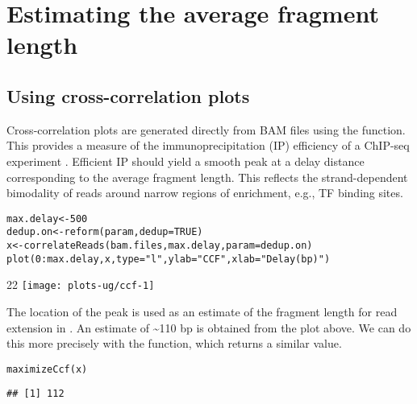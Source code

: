\documentclass{report}\usepackage[]{graphicx}\usepackage[usenames,dvipsnames]{color}
\makeatletter
\def\maxwidth{ %
  \ifdim\Gin@nat@width>\linewidth
    \linewidth
  \else
    \Gin@nat@width
  \fi
}
\newcommand{\hlnum}[1]{\textcolor[rgb]{0.816,0.125,0.439}{#1}}%
\newcommand{\hlstr}[1]{\textcolor[rgb]{0.251,0.627,0.251}{#1}}%
\newcommand{\hlopt}[1]{\textcolor[rgb]{0,0,0}{#1}}%
\newcommand{\hlstd}[1]{\textcolor[rgb]{0.251,0.251,0.251}{#1}}%
\newcommand{\hlkwb}[1]{\textcolor[rgb]{0,0,0}{#1}}%
\newcommand{\hlkwc}[1]{\textcolor[rgb]{0.251,0.251,0.251}{#1}}%
\newcommand{\hlkwd}[1]{\textcolor[rgb]{0.878,0.439,0.125}{#1}}%
\newenvironment{knitrout}{}{} %
\makeatother
\begin{document}
\section{Estimating the average fragment length}
\label{sec:ccf}

\subsection{Using cross-correlation plots}
Cross-correlation plots are generated directly from BAM files using the  function. 
This provides a measure of the immunoprecipitation (IP) efficiency of a ChIP-seq experiment \cite{kharchenko2008}. 
Efficient IP should yield a smooth peak at a delay distance corresponding to the average fragment length. 
This reflects the strand-dependent bimodality of reads around narrow regions of enrichment, e.g., TF binding sites. 

\begin{knitrout}
\color{fgcolor}\begin{kframe}
\begin{alltt}
\hlstd{max.delay} \hlkwb{<-} \hlnum{500}
\hlstd{dedup.on} \hlkwb{<-} \hlkwd{reform}\hlstd{(param,} \hlkwc{dedup}\hlstd{=}\hlnum{TRUE}\hlstd{)}
\hlstd{x} \hlkwb{<-} \hlkwd{correlateReads}\hlstd{(bam.files, max.delay,} \hlkwc{param}\hlstd{=dedup.on)}
\hlkwd{plot}\hlstd{(}\hlnum{0}\hlopt{:}\hlstd{max.delay, x,} \hlkwc{type}\hlstd{=}\hlstr{"l"}\hlstd{,} \hlkwc{ylab}\hlstd{=}\hlstr{"CCF"}\hlstd{,} \hlkwc{xlab}\hlstd{=}\hlstr{"Delay (bp)"}\hlstd{)}
\end{alltt}
\end{kframe}\begin{adjustwidth}{2\fltoffset}{2\fltoffset}
\texttt{[image: plots-ug/ccf-1]} \end{adjustwidth}
\end{knitrout}

The location of the peak is used as an estimate of the fragment length for read extension in . 
An estimate of \textasciitilde{}110 bp is obtained from the plot above.
We can do this more precisely with the  function, which returns a similar value.

\begin{knitrout}
\color{fgcolor}\begin{kframe}
\begin{alltt}
\hlkwd{maximizeCcf}\hlstd{(x)}
\end{alltt}
\begin{verbatim}
## [1] 112
\end{verbatim}
\end{kframe}
\end{knitrout}
\end{document}
